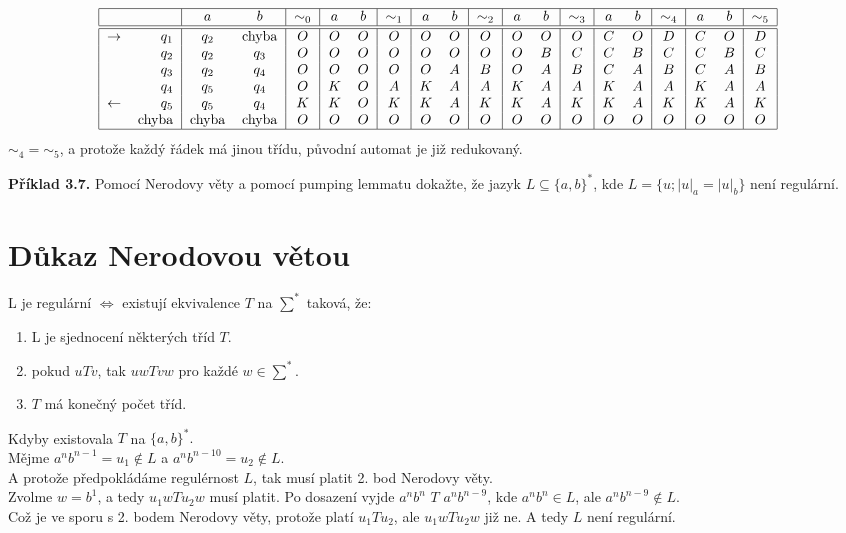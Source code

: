 \documentclass[11pt]{article}
\begin{document}
\[
\begin{tabular}{|r r|cc|c|cc|c|cc|c|cc|c|cc|c|cc|c|}
    \hline
    & & $a$ & $b$ & $\sim_0$ & $a$ & $b$ & $\sim_1$ & $a$ & $b$ & $\sim_2$ & $a$ & $b$ & $\sim_3$ & $a$ & $b$ & $\sim_4$ & $a$ & $b$ & $\sim_5$\\
    \hline
    \hline
    $\rightarrow$& $q_1$& $q_2$& chyba& $O$ & $O$ & $O$ & $O$ & $O$ & $O$ & $O$ & $O$ & $O$ & $O$ & $C$ & $O$ & $D$ & $C$ & $O$ & $D$\\
                 & $q_2$& $q_2$& $q_3$& $O$ & $O$ & $O$ & $O$ & $O$ & $O$ & $O$ & $O$ & $B$ & $C$ & $C$ & $B$ & $C$ & $C$ & $B$ & $C$\\
                 & $q_3$& $q_2$& $q_4$& $O$ & $O$ & $O$ & $O$ & $O$ & $A$ & $B$ & $O$ & $A$ & $B$ & $C$ & $A$ & $B$ & $C$ & $A$ & $B$\\
                 & $q_4$& $q_5$& $q_4$& $O$ & $K$ & $O$ & $A$ & $K$ & $A$ & $A$ & $K$ & $A$ & $A$ & $K$ & $A$ & $A$ & $K$ & $A$ & $A$\\
    $\leftarrow$ & $q_5$& $q_5$& $q_4$& $K$ & $K$ & $O$ & $K$ & $K$ & $A$ & $K$ & $K$ & $A$ & $K$ & $K$ & $A$ & $K$ & $K$ & $A$ & $K$\\
                 & chyba& chyba& chyba& $O$ & $O$ & $O$ & $O$ & $O$ & $O$ & $O$ & $O$ & $O$ & $O$ & $O$ & $O$ & $O$ & $O$ & $O$ & $O$\\ 
    \hline
\end{tabular}
\]
\noindent
$\sim_4 = \sim_5$, a protože každý řádek má jinou třídu, původní automat je již redukovaný.


\pagebreak 

\textbf{Příklad 3.7.} Pomocí Nerodovy věty a pomocí pumping lemmatu dokažte, že jazyk $L \subseteq \{a, b\}^*$, kde $L=\{u; |u|_a = |u|_b\}$ není regulární.

\section{Důkaz Nerodovou větou} 
L je regulární $\iff$ existují ekvivalence $T$ na $\sum^*$ taková, že:
\begin{enumerate}
    \item L je sjednocení některých tříd $T$.
    \item pokud $uTv$, tak $uwTvw$ pro každé $w \in \sum^*$.
    \item $T$ má konečný počet tříd.
\end{enumerate}
Kdyby existovala $T$ na $\{a, b\}^*.$\\
Mějme $a^n b^{n-1} = u_1 \not\in L$ a $a^n b^{n-10}= u_2 \not\in L$.\\
A protože předpokládáme regulérnost $L$, tak musí platit 2. bod Nerodovy věty.\\
Zvolme $w=b^1$, a tedy $u_1 w T u_2 w$ musí platit. Po dosazení vyjde $a^n b^n$ $T$ $a^n b^{n-9}$, kde $a^n b^n \in L$, ale $a^n b^{n-9} \not\in L$.\\
Což je ve sporu s 2. bodem Nerodovy věty, protože platí $u_1Tu_2$, ale $u_1 w T u_2 w$ již ne. A tedy $L$ není regulární.
\end{document}
